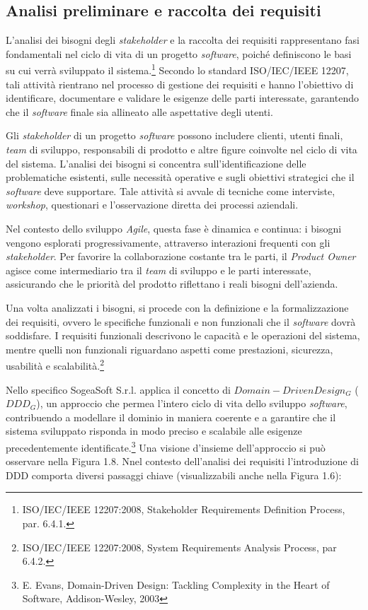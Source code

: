         \subsection{Analisi preliminare e raccolta dei requisiti}
        L’analisi dei bisogni degli \textit{stakeholder} e la raccolta dei requisiti rappresentano fasi fondamentali nel ciclo di vita di un progetto \textit{software}, poiché definiscono le basi su cui verrà sviluppato il sistema.\footnote{ISO/IEC/IEEE 12207:2008, Stakeholder Requirements Definition Process, par. 6.4.1.} Secondo lo standard ISO/IEC/IEEE 12207, tali attività rientrano nel processo di gestione dei requisiti e hanno l’obiettivo di identificare, documentare e validare le esigenze delle parti interessate, garantendo che il \textit{software} finale sia allineato alle aspettative degli utenti. 

        \noindent Gli \textit{stakeholder} di un progetto \textit{software} possono includere clienti, utenti finali, \textit{team} di sviluppo, responsabili di prodotto e altre figure coinvolte nel ciclo di vita del sistema. L’analisi dei bisogni si concentra sull’identificazione delle problematiche esistenti, sulle necessità operative e sugli obiettivi strategici che il \textit{software} deve supportare. Tale attività si avvale di tecniche come interviste, \textit{workshop}, questionari e l’osservazione diretta dei processi aziendali.

        \noindent Nel contesto dello sviluppo \textit{Agile}, questa fase è dinamica e continua: i bisogni vengono esplorati progressivamente, attraverso interazioni frequenti con gli \textit{stakeholder}. Per favorire la collaborazione costante tra le parti, il \textit{Product Owner} agisce come intermediario tra il \textit{team} di sviluppo e le parti interessate, assicurando che le priorità del prodotto riflettano i reali bisogni dell’azienda.

        \noindent Una volta analizzati i bisogni, si procede con la definizione e la formalizzazione dei requisiti, ovvero le specifiche funzionali e non funzionali che il \textit{software} dovrà soddisfare. I requisiti funzionali descrivono le capacità e le operazioni del sistema, mentre quelli non funzionali riguardano aspetti come prestazioni, sicurezza, usabilità e scalabilità.\footnote{ISO/IEC/IEEE 12207:2008, System Requirements Analysis Process, par 6.4.2.}

        \noindent Nello specifico SogeaSoft S.r.l. applica il concetto di \textit{$Domain-Driven Design_G$} ($DDD_G$), un approccio che permea l’intero ciclo di vita dello sviluppo \textit{software}, contribuendo a modellare il dominio in maniera coerente e a garantire che il sistema sviluppato risponda in modo preciso e scalabile alle esigenze precedentemente identificate.\footnote{E. Evans, Domain-Driven Design: Tackling Complexity in the Heart of Software, Addison-Wesley, 2003} Una visione d'insieme dell'approccio si può osservare nella Figura 1.8.
        Nnel contesto dell'analisi dei requisiti l'introduzione di DDD comporta diversi passaggi chiave (visualizzabili anche nella Figura 1.6):

